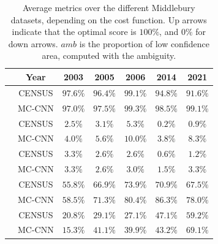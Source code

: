 \begin{table}[ht!]
\centering
\renewcommand{\arraystretch}{1.5}
\begin{tabular}{|c|c||c|c|c|c|c|}
\cline{2-7}
\rowcolor{lightgray}
\multicolumn{1}{c|}{\cellcolor{white}}& Year & 2003 & 2005 & 2006 & 2014 & 2021 \\ \hline

\rowcolor{color_census}
\cellcolor{white} & CENSUS & $97.6\%$ & $96.4\%$ & $99.1\%$ & $94.8\%$ & $91.6\%$\\\cline{2-7}

\rowcolor{color_mccnn}
\multirow{-2}{*}{\cellcolor{white} $acc$ $\uparrow$} & MC-CNN & $97.0\%$ & $97.5\%$ & $99.3\%$ & $98.5\%$ & $99.1\%$\\

\rowcolor{color_census}\hline
\cellcolor{white} & CENSUS & $2.5\%$ & $3.1\%$ & $5.3\%$ & $0.2\%$ & $0.9\%$\\\cline{3-7} 

\rowcolor{color_mccnn}
\multirow{-2}{*}{\cellcolor{white} $\varepsilon_{~~~}$ $\downarrow$} & MC-CNN & $4.0\%$ & $5.6\%$ & $10.0\%$ & $3.8\%$ & $8.3\%$\\

\rowcolor{color_census}\hline
\cellcolor{white} & CENSUS & $3.3\%$ & $2.6\%$ & $2.6\%$ & $0.6\%$ & $1.2\%$\\\cline{3-7} 

\rowcolor{color_mccnn}
\multirow{-2}{*}{\cellcolor{white} $s_{rel}$ $\downarrow$} & MC-CNN & $3.3\%$ & $2.6\%$ & $3.0\%$ & $1.5\%$ & $3.3\%$\\

\rowcolor{color_census}\hline
\cellcolor{white} & CENSUS & $55.8\%$ & $66.9\%$ & $73.9\%$ & $70.9\%$ & $67.5\%$\\\cline{3-7} 

\rowcolor{color_mccnn}
\multirow{-2}{*}{\cellcolor{white} $o_{rel}$ $\downarrow$} & MC-CNN & $58.5\%$ & $71.3\%$ & $80.4\%$ & $86.3\%$ & $78.0\%$\\

\rowcolor{color_census}\hline
\cellcolor{white} & CENSUS & $20.8\%$ & $29.1\%$ & $27.1\%$ & $47.1\%$ & $59.2\%$\\\cline{3-7} 

\rowcolor{color_mccnn}
\multirow{-2}{*}{\cellcolor{white} $p_{amb}$} & MC-CNN & $15.3\%$ & $41.1\%$ & $39.9\%$ & $43.2\%$ & $69.1\%$\\\hline


\end{tabular}
\renewcommand{\arraystretch}{1}
\caption{Average metrics over the different Middlebury datasets, depending on the cost function. Up arrows indicate that the optimal score is $100\%$, and $0\%$ for down arrows. $amb$ is the proportion of low confidence area, computed with the ambiguity.}\label{tab:metric_average}
\end{table}


